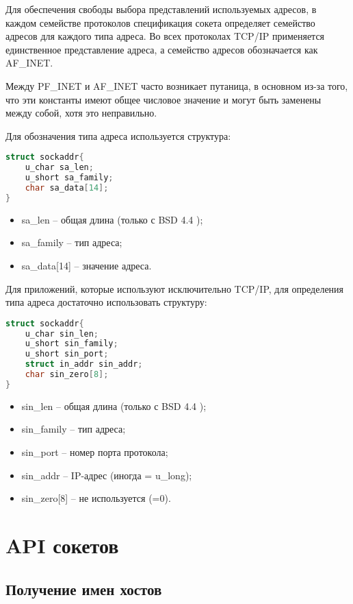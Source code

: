 Для обеспечения свободы выбора представлений используемых адресов,  в каждом семействе протоколов спецификация сокета определяет семейство адресов для каждого типа адреса. Во всех протоколах TCP/IP применяется единственное представление адреса,  а семейство адресов обозначается как AF\_INET.

Между PF\_INET и AF\_INET часто возникает путаница,  в основном из-за того,  что эти константы имеют общее числовое значение и могут быть заменены между собой,  хотя это неправильно.

Для обозначения типа адреса используется структура:

\begin{lstlisting}[language=C]
struct sockaddr{
	u_char sa_len;
	u_short sa_family;
	char sa_data[14];
}
\end{lstlisting}

\begin{itemize}
\item sa\_len -- общая длина (только с BSD 4.4 );
\item sa\_family -- тип адреса;
\item sa\_data[14] -- значение адреса.
\end{itemize}

Для приложений,  которые используют исключительно TCP/IP,  для определения типа адреса достаточно использовать структуру:
\begin{lstlisting}[language=C]
struct sockaddr{
	u_char sin_len;
	u_short sin_family;
	u_short sin_port;
	struct in_addr sin_addr;
	char sin_zero[8];
}
\end{lstlisting}

\begin{itemize}
\item sin\_len -- общая длина (только с BSD 4.4 );
\item sin\_family -- тип адреса;
\item sin\_port -- номер порта протокола;
\item sin\_addr -- IP-адрес (иногда = u\_long);
\item sin\_zero[8] -- не используется (=0).
\end{itemize}

\section{API сокетов}
\subsection{Получение имен хостов}

